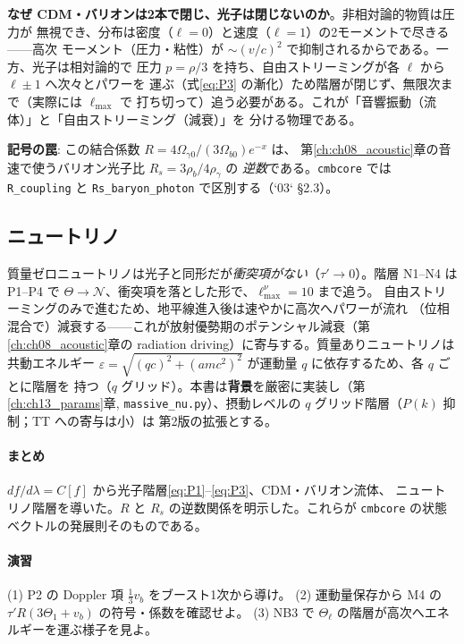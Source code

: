 \begin{intuition}
\textbf{なぜ CDM・バリオンは2本で閉じ、光子は閉じないのか}。非相対論的物質は圧力が
無視でき、分布は密度（$\ell=0$）と速度（$\ell=1$）の2モーメントで尽きる——高次
モーメント（圧力・粘性）が $\sim(v/c)^2$ で抑制されるからである。一方、光子は相対論的で
圧力 $p=\rho/3$ を持ち、自由ストリーミングが各 $\ell$ から $\ell\pm1$ へ次々とパワーを
運ぶ（式\eqref{eq:P3} の漸化）ため階層が閉じず、無限次まで（実際には $\ell_{\max}$ で
打ち切って）追う必要がある。これが「音響振動（流体）」と「自由ストリーミング（減衰）」を
分ける物理である。
\end{intuition}

\begin{numreality}
\textbf{記号の罠}: この結合係数 $R=4\Omega_{\gamma0}/(3\Omega_{b0})e^{-x}$ は、
第\ref{ch:ch08_acoustic}章の音速で使うバリオン光子比 $R_s=3\rho_b/4\rho_\gamma$ の
\emph{逆数}である。\texttt{cmbcore} では \texttt{R\_coupling} と \texttt{Rs\_baryon\_photon}
で区別する（`03` §2.3）。
\end{numreality}

\subsection{ニュートリノ}
質量ゼロニュートリノは光子と同形だが\emph{衝突項がない}（$\tau'\to0$）。階層 N1--N4 は
P1--P4 で $\Theta\to\mathcal N$、衝突項を落とした形で、$\ell_{\max}^\nu=10$ まで追う。
自由ストリーミングのみで進むため、地平線進入後は速やかに高次へパワーが流れ
（位相混合で）減衰する——これが放射優勢期のポテンシャル減衰（第\ref{ch:ch08_acoustic}章の
radiation driving）に寄与する。質量ありニュートリノは共動エネルギー
$\varepsilon=\sqrt{(qc)^2+(amc^2)^2}$ が運動量 $q$ に依存するため、各 $q$ ごとに階層を
持つ（$q$ グリッド）。本書は\textbf{背景}を厳密に実装し（第\ref{ch:ch13_params}章,
\texttt{massive\_nu.py}）、摂動レベルの $q$ グリッド階層（$P(k)$ 抑制；TT への寄与は小）は
第2版の拡張とする。

\paragraph{まとめ}
$df/d\lambda=C[f]$ から光子階層\eqref{eq:P1}--\eqref{eq:P3}、CDM・バリオン流体、
ニュートリノ階層を導いた。$R$ と $R_s$ の逆数関係を明示した。これらが
\texttt{cmbcore} の状態ベクトルの発展則そのものである。

\paragraph{演習}
(1) P2 の Doppler 項 $\tfrac13 v_b$ をブースト1次から導け。
(2) 運動量保存から M4 の $\tau'R(3\Theta_1+v_b)$ の符号・係数を確認せよ。
(3) NB3 で $\Theta_\ell$ の階層が高次へエネルギーを運ぶ様子を見よ。
